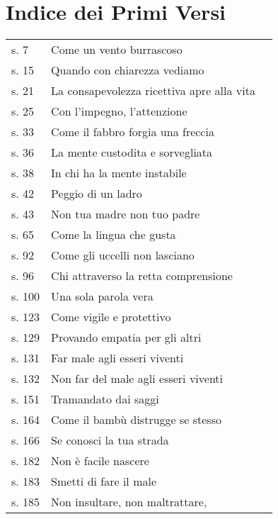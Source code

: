 \chapter{Indice dei Primi Versi}

{\smaller
\setlength{\parskip}{0pt}
\setlength{\parindent}{0pt}

\begin{longtable}[c]{llr}
s. 7 & Come un vento burrascoso & \pageref{dhp-7}\\
s. 15 & Quando con chiarezza vediamo & \pageref{dhp-15}\\
s. 21 & La consapevolezza ricettiva apre alla vita & \pageref{dhp-21}\\
s. 25 & Con l'impegno, l'attenzione & \pageref{dhp-25}\\
s. 33 & Come il fabbro forgia una freccia & \pageref{dhp-33}\\
s. 36 & La mente custodita e sorvegliata & \pageref{dhp-36}\\
s. 38 & In chi ha la mente instabile & \pageref{dhp-38}\\
s. 42 & Peggio di un ladro & \pageref{dhp-42}\\
s. 43 & Non tua madre non tuo padre & \pageref{dhp-43}\\
s. 65 & Come la lingua che gusta & \pageref{dhp-65}\\
s. 92 & Come gli uccelli non lasciano & \pageref{dhp-92}\\
s. 96 & Chi attraverso la retta comprensione & \pageref{dhp-96}\\
s. 100 & Una sola parola vera & \pageref{dhp-100}\\
s. 123 & Come vigile e protettivo & \pageref{dhp-123}\\
s. 129 & Provando empatia per gli altri & \pageref{dhp-129}\\
s. 131 & Far male agli esseri viventi & \pageref{dhp-131}\\
s. 132 & Non far del male agli esseri viventi & \pageref{dhp-132}\\
s. 151 & Tramandato dai saggi & \pageref{dhp-151}\\
s. 164 & Come il bambù distrugge se stesso & \pageref{dhp-164}\\
s. 166 & Se conosci la tua strada & \pageref{dhp-166}\\
s. 182 & Non è facile nascere & \pageref{dhp-182}\\
s. 183 & Smetti di fare il male & \pageref{dhp-183}\\
s. 185 & Non insultare, non maltrattare, & \pageref{dhp-185}\\

\end{longtable}}
